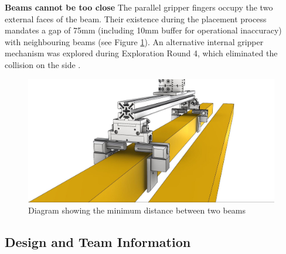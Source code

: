 \textbf{Beams cannot be too close} The parallel gripper fingers occupy the two external faces of the beam. Their existence during the placement process mandates a gap of 75mm (including 10mm buffer for operational inaccuracy) with neighbouring beams (see Figure \ref{fig:gripper-spacing}). An alternative internal gripper mechanism was explored during Exploration Round 4, which eliminated the collision on the side .

\begin{figure}
    \centering
    \includegraphics[width=0.99\textwidth]{images/05/image93.jpg}
    \caption{Diagram showing the minimum distance between two beams}
    \label{fig:gripper-spacing}
\end{figure}

\FloatBarrier

\subsection{Design and Team Information}
\label{subsection:exploration-2-design-and-team-information}

